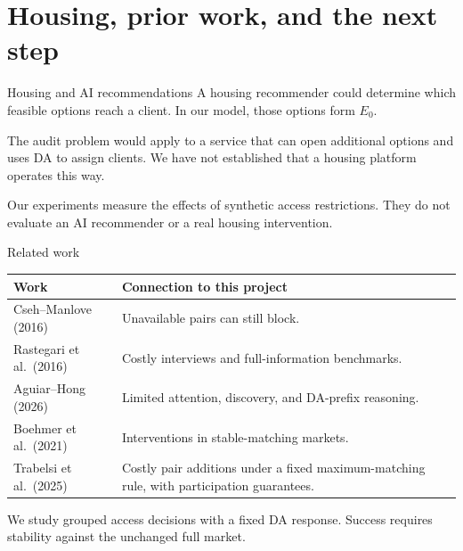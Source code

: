 \section{Housing, prior work, and the next step}
\begin{frame}[t,label=housing]{Housing and AI recommendations}
\small
A housing recommender could determine which feasible options reach a client.
In our model, those options form $E_0$.

\medskip
The audit problem would apply to a service that can open additional options
and uses DA to assign clients. We have not established that a housing platform
operates this way.

\medskip
Our experiments measure the effects of synthetic access restrictions.
They do not evaluate an AI recommender or a real housing intervention.
\end{frame}





\begin{frame}[t,label=literature]{Related work}
\fontsize{11}{13}\selectfont
\begin{tabularx}{\linewidth}{@{}>{\raggedright\arraybackslash}p{.34\linewidth}>{\raggedright\arraybackslash}X@{}}
\toprule
Work & Connection to this project\\
\midrule
Cseh--Manlove (2016) & Unavailable pairs can still block.\\[4pt]
Rastegari et al.\ (2016) & Costly interviews and full-information benchmarks.\\[4pt]
Aguiar--Hong (2026) & Limited attention, discovery, and DA-prefix reasoning.\\[4pt]
Boehmer et al.\ (2021) & Interventions in stable-matching markets.\\[4pt]
Trabelsi et al.\ (2025) & Costly pair additions under a fixed maximum-matching rule, with participation guarantees.\\
\bottomrule
\end{tabularx}
\par\medskip
We study grouped access decisions with a fixed DA response.
Success requires stability against the unchanged full market.
\end{frame}

